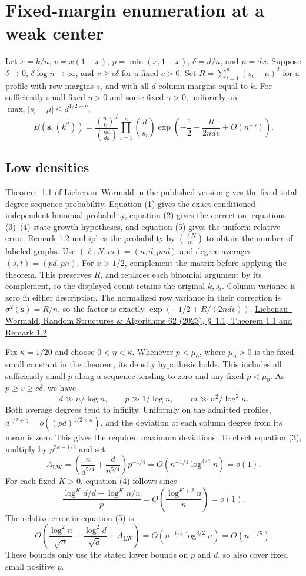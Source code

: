 \section{Fixed-margin enumeration at a weak center}\label{app:sparse-enumeration}

Let $x=k/n$, $v=x(1-x)$, $p=\min(x,1-x)$, $\delta=d/n$, and $\mu=dx$. Suppose $\delta\to0$, $\delta\log n\to\infty$, and $v\ge c\delta$ for a fixed $c>0$. Set $R=\sum_{i=1}^n(s_i-\mu)^2$ for a profile with row margins $s_i$ and with all $d$ column margins equal to $k$. For sufficiently small fixed $\eta>0$ and some fixed $\gamma>0$, uniformly on $\max_i|s_i-\mu|\le d^{1/2+\eta}$,
\[
B(\mathbf s,(k^d))
=\frac{\binom nk^d}{\binom{nd}{dk}}\prod_{i=1}^n\binom d{s_i}
\exp\left(-\frac12+\frac{R}{2ndv}+O(n^{-\gamma})\right).
\]

\subsection{Low densities}

Theorem~1.1 of Liebenau--Wormald \cite{LW} in the published version gives the fixed-total degree-sequence probability. Equation (1) gives the exact conditioned independent-binomial probability, equation (2) gives the correction, equations (3)--(4) state growth hypotheses, and equation (5) gives the uniform relative error. Remark 1.2 multiplies the probability by $\binom{\ell N}{m}$ to obtain the number of labeled graphs. Use $(\ell,N,m)=(n,d,pnd)$ and degree averages $(s,t)=(pd,pn)$. For $x>1/2$, complement the matrix before applying the theorem. This preserves $R$, and replaces each binomial argument by its complement, so the displayed count retains the original $k,s_i$. Column variance is zero in either description. The normalized row variance in their correction is $\sigma^2(\mathbf s)=R/n$, so the factor is exactly $\exp(-1/2+R/(2ndv))$. \href{https://onlinelibrary.wiley.com/doi/full/10.1002/rsa.21105\#rsa21105-mthst-0001}{Liebenau--Wormald, Random Structures \& Algorithms 62 (2023), \S~1.1, Theorem 1.1 and Remark 1.2}

Fix $\kappa=1/20$ and choose $0<\eta<\kappa$. Whenever $p<\mu_0$, where $\mu_0>0$ is the fixed small constant in the theorem, its density hypothesis holds. This includes all sufficiently small $p$ along a sequence tending to zero and any fixed $p<\mu_0$. As $p\ge v\ge c\delta$, we have
\[
d\gg n/\log n,\qquad p\gg1/\log n,\qquad m\gg n^2/\log^2 n .
\]
Both average degrees tend to infinity. Uniformly on the admitted profiles,
$d^{1/2+\eta}=o((pd)^{1/2+\kappa})$, and the deviation of each column degree from its mean is zero. This gives the required maximum deviations. To check equation (3), multiply by $p^{5\kappa-1/2}$ and set
\[
A_{\mathrm{LW}}=
\left(\frac{n}{d^{5/4}}+\frac{d}{n^{5/4}}\right)p^{-1/4}
=O(n^{-1/4}\log^{3/2}n)=o(1).
\]
For each fixed $K>0$, equation (4) follows since
\[
\frac{\log^K d/d+\log^K n/n}{p}
=O\left(\frac{\log^{K+2}n}{n}\right)=o(1).
\]
The relative error in equation (5) is
\[
O\left(\frac{\log^2 n}{\sqrt n}+\frac{\log^2 d}{\sqrt d}+A_{\mathrm{LW}}\right)
=O(n^{-1/4}\log^{3/2}n)=O(n^{-1/5}).
\]
These bounds only use the stated lower bounds on $p$ and $d$, so also cover fixed small positive $p$.

